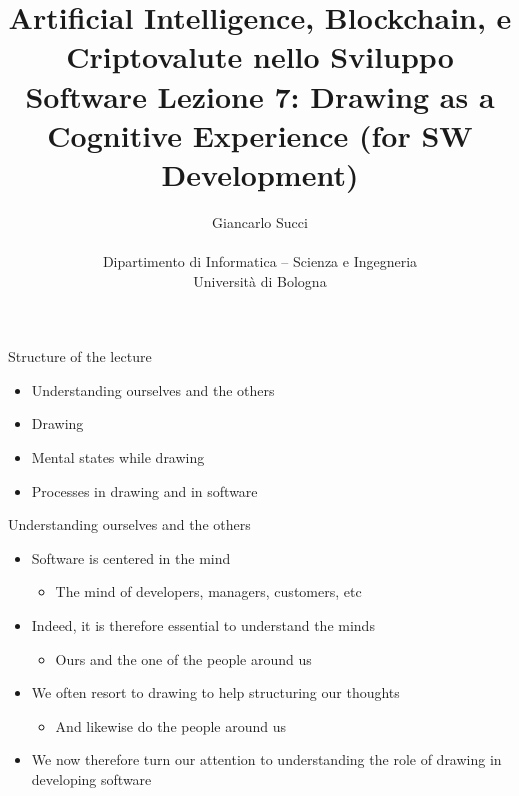 \documentclass{beamer}
\title[L07]{Artificial Intelligence, Blockchain, e Criptovalute nello Sviluppo Software \newline\newline
Lezione 7: Drawing as a Cognitive Experience (for SW Development)} %
\author[{\tiny Giancarlo Succi }]{Giancarlo Succi\\\\ Dipartimento di Informatica -- Scienza e Ingegneria\\Universit\`{a} di Bologna\\
\bftt{g.succi@unibo.it}
} %
\institute[unibo] %
\date{} %
\begin{document}
\begin{frame}
\titlepage %

\end{frame}





\begin{frame}
{\centerline{Structure of the lecture}}
\begin{itemize}
    \item Understanding ourselves and the others
    \item Drawing
    \item Mental states while drawing
    \item Processes in drawing and in software
    \end{itemize}
\end{frame}

\begin{frame}
{\centerline{Understanding ourselves and the others}}
 
\begin{itemize}
\item Software is centered in the mind
\begin{itemize}
\item The mind of developers, managers, customers, etc
\end{itemize} 
\item Indeed, it is therefore essential to understand the minds
\begin{itemize}
\item Ours and the one of the people around us
\end{itemize} 
\item We often resort to drawing to help structuring our thoughts
\begin{itemize}
\item And likewise do the people around us
\end{itemize} 
\item We now therefore turn our attention to understanding the role of drawing in developing software
\end{itemize} 

\end{frame}
\end{document}
